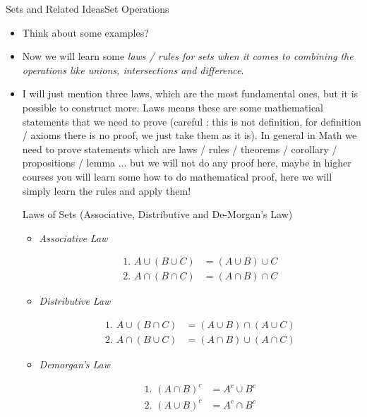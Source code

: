 \documentclass[8pt,usepdftitle=false]{beamer}
\begin{document}
\begin{frame}[allowframebreaks]{Sets and Related Ideas}{Set Operations}
\begin{itemize}
\item Think about some examples?


\framebreak

\item Now we will learn some \emph{laws / rules for sets when it comes to combining the operations like unions, intersections and difference}.

\item I will just mention three laws, which are the most fundamental ones, but it is possible to construct more. Laws means these are some mathematical statements that we need to prove (careful : this is not definition, for definition / axioms there is no proof, we just take them as it is). In general in Math we need to prove statements which are laws / rules / theorems / corollary / propositions / lemma ... but we will not do any proof here, maybe in higher courses you will learn some how to do mathematical proof, here we will simply learn the rules and apply them!




\begin{block}{Laws of Sets (Associative, Distributive and De-Morgan's Law)}
    
\begin{itemize}
\item \emph{Associative Law} 

\begin{align*}
\text{1. } A \cup (B \cup C) &= (A \cup B)\cup C\\
\text{2. } A \cap (B \cap C) &= (A \cap B)\cap C
\end{align*}


\item  \emph{Distributive Law} 


\begin{align*}
\text{1. } A \cup (B \cap C) &= (A \cup B)\cap (A \cup C) \\
\text{2. } A \cap (B \cup C) &= (A \cap B) \cup (A \cap C)
\end{align*} 

\item \emph{Demorgan's Law}

\begin{align*}
\text{1. } (A \cap B)^c &= A^{c} \cup B^{c} \\
\text{2. } (A \cup B)^c &=  A^{c} \cap B^{c} 
\end{align*}

\end{itemize}


\end{block}
\end{itemize}
\end{frame}
\end{document}
